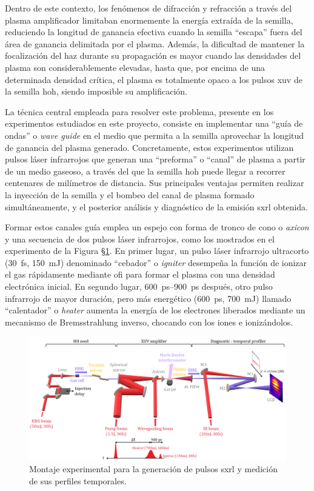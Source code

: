 Dentro de este contexto, los fenómenos de difracción y refracción a través del plasma amplificador limitaban enormemente la energía extraída de la semilla, reduciendo la longitud de ganancia efectiva cuando la semilla \enquote{escapa} fuera del área de ganancia delimitada por el plasma. Además, la dificultad de mantener la focalización del haz durante su propagación es mayor cuando las densidades del plasma son considerablemente elevadas, hasta que, por encima de una determinada densidad crítica, el plasma es totalmente opaco a los pulsos \acrshort{xuv} de la semilla \acrshort{hoh}, siendo imposible su amplificación.

La técnica central empleada para resolver este problema, presente en los experimentos estudiados en este proyecto, consiste en implementar una \enquote{guía de ondas} o \emph{wave guide} en el medio que permita a la semilla aprovechar la longitud de ganancia del plasma generado. Concretamente, estos experimentos utilizan pulsos láser infrarrojos que generan una \enquote{preforma} o \enquote{canal} de plasma a partir de un medio gaseoso, a través del que la semilla \acrshort{hoh} puede llegar a recorrer centenares de milímetros de distancia. Sus principales ventajas permiten realizar la inyección de la semilla y el bombeo del canal de plasma formado simultáneamente, y el posterior análisis y diagnóstico de la emisión \acrshort{sxrl} obtenida.

Formar estos canales guía emplea un espejo con forma de tronco de cono o \emph{axicon} y una secuencia de dos pulsos láser infrarrojos, como los mostrados en el experimento de la Figura \S\ref{fig:1.28}. En primer lugar, un pulso láser infrarrojo ultracorto (\qty{30}{fs}, \qty{150}{mJ}) denominado \enquote{cebador} o \emph{igniter} desempeña la función de ionizar el gas rápidamente mediante \acrshort{ofi} para formar el plasma con una densidad electrónica inicial. En segundo lugar, \qtyrange{600}{900}{ps} después, otro pulso infrarrojo de mayor duración, pero más energético (\qty{600}{ps}, \qty{700}{mJ}) llamado \enquote{calentador} o \emph{heater} aumenta la energía de los electrones liberados mediante un mecanismo de Bremsstrahlung inverso, chocando con los iones e ionizándolos.

\begin{figure}[htbp]
  \centering
  \includegraphics[width=\textwidth]{Figuras/ch1_secuencia.png}
  \caption{Montaje experimental para la generación de pulsos \acrshort{sxrl} y medición de sus perfiles temporales. \autocite{Kabacinski2022}}
  \label{fig:1.28}
\end{figure}

